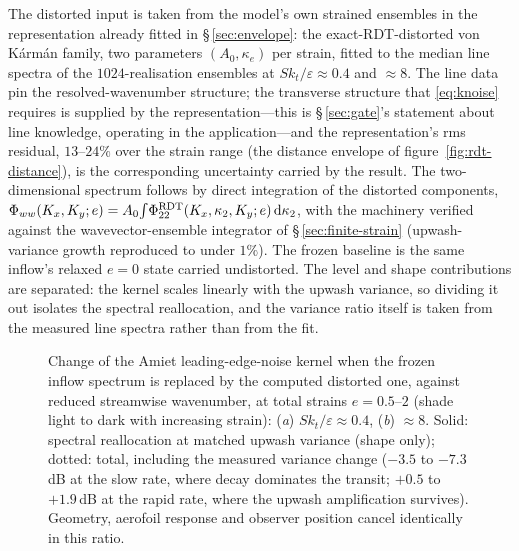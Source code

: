 \documentclass[11pt,a4paper]{article}
\begin{document}
The distorted input is taken from the model's own strained ensembles in
the representation already fitted in \S\,\ref{sec:envelope}: the
exact-RDT-distorted von K\'arm\'an family, two parameters
$(A_0,\kappa_e)$ per strain, fitted to the median line spectra of the
$1024$-realisation ensembles at $Sk_t/\varepsilon\approx0.4$ and
$\approx8$. The line data pin the resolved-wavenumber structure; the
transverse structure that \eqref{eq:knoise} requires is supplied by the
representation---this is \S\,\ref{sec:gate}'s statement about line
knowledge, operating in the application---and the representation's rms
residual, $13$--$24\%$ over the strain range (the distance envelope of
figure~\ref{fig:rdt-distance}), is the corresponding uncertainty
carried by the result. The two-dimensional spectrum follows by direct
integration of the distorted components,
$\Phi_{ww}(K_x,K_y;e)=A_0\!\int\!\Phi^{\rm RDT}_{22}
(K_x,\kappa_2,K_y;e)\,\mathrm{d}\kappa_2$, with the machinery verified
against the wavevector-ensemble integrator of
\S\,\ref{sec:finite-strain} (upwash-variance growth reproduced to
under $1\%$). The frozen baseline is the same inflow's relaxed $e=0$
state carried undistorted. The level and shape contributions are
separated: the kernel scales linearly with the upwash variance, so
dividing it out isolates the spectral reallocation, and the variance
ratio itself is taken from the measured line spectra rather than from
the fit.

\begin{figure}
  \centering
  \caption{Change of the Amiet leading-edge-noise kernel when the
  frozen inflow spectrum is replaced by the computed distorted one,
  against reduced streamwise wavenumber, at total strains
  $e=0.5$--$2$ (shade light to dark with increasing strain):
  (\textit{a}) $Sk_t/\varepsilon\approx0.4$,
  (\textit{b}) $\approx8$. Solid: spectral reallocation at matched
  upwash variance (shape only); dotted: total, including the measured
  variance change ($-3.5$ to $-7.3$\,dB at the slow rate, where decay
  dominates the transit; $+0.5$ to $+1.9$\,dB at the rapid rate, where
  the upwash amplification survives). Geometry, aerofoil response and
  observer position cancel identically in this ratio.}
  \label{fig:lenoise}
\end{figure}
\end{document}
